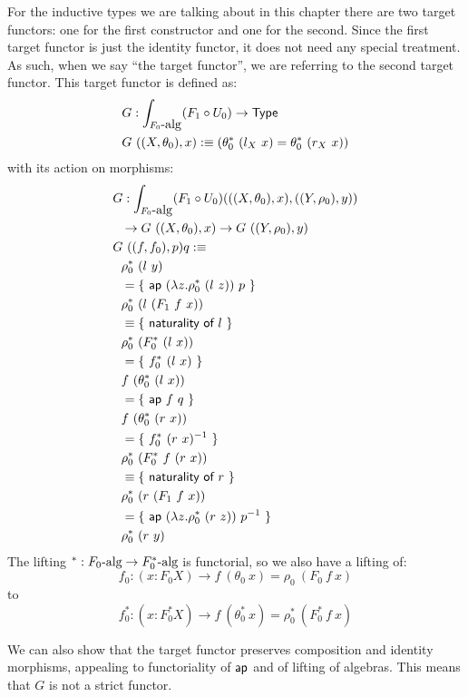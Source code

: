 \documentclass[a4paper,10pt]{report}
\begin{document}
For the inductive types we are talking about in this chapter there are
two target functors: one for the first constructor and one for the
second. Since the first target functor is just the identity functor,
it does not need any special treatment. As such, when we say ``the
target functor'', we are referring to the second target functor. This
target functor is defined as:
%
\begin{align*}
&G : \int_{\algcat{F_0}} (F_1 \circ U_0) \to \Type \\
&G\ ((X,\theta_0), x) \ddefeq (\theta_0^*\ (l_{X}\ x) = \theta_0^*\ (r_{X}\ x))
\end{align*}
%
with its action on morphisms:
%
\begin{align*}
&G : \int_{F_0\mbox{-alg}} (F_1 \circ U_0) (((X,\theta_0),x),((Y,\rho_0),y)) \\
&\ \ \to G\ ((X,\theta_0),x) \to G\ ((Y,\rho_0),y) \\
&G\ ((f,f_0),p) q :\equiv \\
&\ \ \rho_0^*\ (l\ y) \\
&\ \ = \{\ \mathsf{ap}\ (\lambda z . \rho_0^*\ (l\ z))\ p\ \} \\
&\ \ \rho_0^*\ (l\ (F_1\ f\ x)) \\
&\ \ \equiv \{\ \textsf{naturality of $l$}\ \} \\
&\ \ \rho_0^*\ (F_0^*\ (l\ x)) \\
&\ \ = \{\ f_0^*\ (l\ x)\ \} \\
&\ \ f\ (\theta_0^*\ (l\ x)) \\
&\ \ = \{\ \mathsf{ap}\ f\ q\ \} \\
&\ \ f\ (\theta_0^*\ (r\ x)) \\
&\ \ = \{\ f_0^*\ (r\ x)^{-1}\ \} \\
&\ \ \rho_0^*\ (F_0^*\ f\ (r\ x)) \\
&\ \ \equiv \{\ \textsf{naturality of $r$}\ \} \\
&\ \ \rho_0^*\ (r\ (F_1\ f\ x)) \\
&\ \ = \{\ \mathsf{ap}\ (\lambda z . \rho_0^*\ (r\ z))\ p^{-1}\ \} \\
&\ \ \rho_0^*\ (r\ y)
\end{align*}
%
The lifting $^* : F_0\mbox{-alg} \to F_0^*\mbox{-alg}$ is functorial, so
we also have a lifting of:
$$
f_0 : (x : F_0 X) \to f\ (\theta_0\ x) = \rho_0\ (F_0\ f\ x)
$$
to
$$
f_0^* : (x : F_0^* X) \to f\ (\theta_0^*\ x) = \rho_0^*\ (F_0^*\ f\ x)
$$

We can also show that the target functor preserves composition and
identity morphisms, appealing to functoriality of $\mathsf{ap}$ and of lifting
of algebras. This means that $G$ is not a strict functor.
\end{document}

